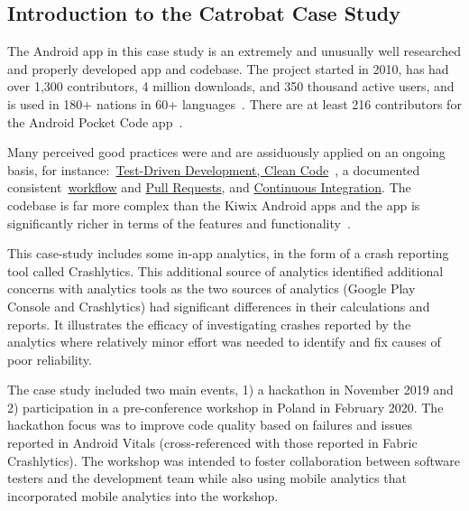 \subsection{Introduction to the Catrobat Case Study}

The Android app in this case study is an extremely and unusually well researched and properly developed app and codebase. The project started in 2010, has had over 1,300 contributors, 4 million downloads, and 350 thousand active users, and is used in 180+ nations in 60+ languages~\citep{catrobat_project}. There are at least 216 contributors for the Android Pocket Code app~\citep{github_catroid}.

Many perceived good practices were and are assiduously applied on an ongoing basis, for instance:~\href{https://github.com/Catrobat/Catroid}{Test-Driven Development, Clean Code}~\citep{catrobat_first_steps_into}, a documented consistent~\href{https://github.com/Catrobat/Catroid/wiki/Workflow}{workflow} and \href{https://github.com/Catrobat/Catroid/wiki/Creating-a-pull-request}{Pull Requests}, and \href{https://jenkins.catrob.at/job/Catroid/}{Continuous Integration}. The codebase is far more complex than the Kiwix Android apps and the app is significantly richer in terms of the features and functionality~\citep{mueller2019_pocketcode}.

This case-study includes some in-app analytics, in the form of a crash reporting tool called Crashlytics. This additional source of analytics identified additional concerns with analytics tools as the two sources of analytics (Google Play Console and Crashlytics) had significant differences in their calculations and reports. It illustrates the efficacy of investigating crashes reported by the analytics where relatively minor effort was needed to identify and fix causes of poor reliability.

The case study included two main events, 1) a hackathon in November 2019 and 2) participation in a pre-conference workshop in Poland in February 2020. 
The hackathon focus was to improve code quality based on failures and issues reported in Android Vitals (cross-referenced with those reported in Fabric Crashlytics). The workshop was intended to foster collaboration between software testers and the development team while also using mobile analytics that incorporated mobile analytics into the workshop.


